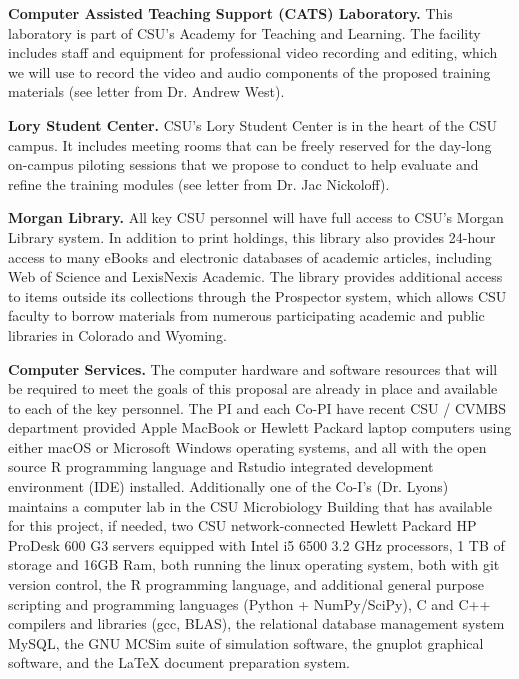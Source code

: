 \documentclass[pdftex,english,11pt,parskip=half]{scrartcl}
\begin{document}
\textbf{Computer Assisted Teaching Support (CATS) Laboratory.} This laboratory is part of CSU's Academy for Teaching and Learning. The facility includes staff and equipment for professional video recording and editing, which we will use to record the video and audio components of the proposed training materials (see letter from Dr. Andrew West). 

\textbf{Lory Student Center.} CSU's Lory Student Center is in the heart of the CSU campus. It includes meeting rooms that can be freely reserved for the day-long on-campus piloting sessions that we propose to conduct to help evaluate and refine the training modules (see letter from Dr. Jac Nickoloff).

\textbf{Morgan Library.} All key CSU personnel will have full access to CSU’s Morgan Library system. In addition to print holdings, this library also provides 24-hour access to many eBooks and electronic databases of academic articles, including Web of Science and LexisNexis Academic. The library provides additional access to items outside its collections through the Prospector system, which allows CSU faculty to borrow materials from numerous participating academic and public libraries in Colorado and Wyoming. 

\textbf{Computer Services.} The computer hardware and software resources that
will be required to meet the goals of this proposal are already in place and
available to each of the key personnel.  The PI and each Co-PI have recent CSU
/ CVMBS department provided Apple MacBook or Hewlett Packard laptop computers
using either macOS or Microsoft Windows operating systems, and all with the
open
source R programming language and Rstudio integrated development environment
(IDE) installed.  Additionally one of the Co-I's (Dr. Lyons) maintains a
computer lab in the CSU Microbiology Building that has available for this
project, if needed, two CSU network-connected Hewlett Packard HP ProDesk
600 G3 servers equipped with Intel i5 6500 3.2 GHz processors, 1 TB of
storage and 16GB Ram,  both running the linux operating system, both with
git version control, the R programming language, and additional
general purpose scripting and programming languages (Python + NumPy/SciPy),
C and C++ compilers and libraries (gcc, BLAS), the relational database
management system MySQL, the GNU MCSim suite of simulation software, the
gnuplot graphical software, and the LaTeX document preparation system.
\end{document}
